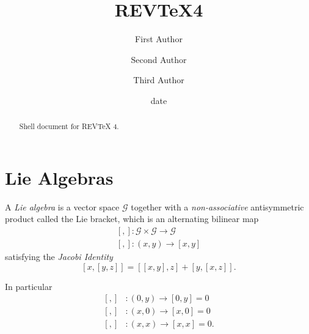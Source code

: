 \documentclass[aps,preprint]{revtex4}%
\begin{document}
\title[Short title for running header]{REV\TeX4}
\author{First Author}
\author{Second Author}
\author{Third Author}

\begin{abstract}
Shell document for REV\TeX{} 4.

\end{abstract}
\date[Date text]{date}




\maketitle
\tableofcontents


\section{Lie Algebras}

A \emph{Lie algebra} is a vector space $\mathcal{G}$ together with a
\emph{non-associative} antisymmetric product called the Lie bracket, which is
an alternating bilinear map
\begin{gather}
\left[  ,\right]  :\mathcal{G}\times\mathcal{G}\rightarrow\mathcal{G}\\
\left[  ,\right]  :\left(  x,y\right)  \rightarrow\left[  x,y\right]
\end{gather}
satisfying the \emph{Jacobi Identity}%
\begin{equation}
\left[  x,\left[  y,z\right]  \right]  =\left[  \left[  x,y\right]  ,z\right]
+\left[  y,\left[  x,z\right]  \right]  .
\end{equation}


In particular
\begin{align}
\left[  ,\right]   &  :\left(  0,y\right)  \rightarrow\left[  0,y\right]  =0\\
\left[  ,\right]   &  :\left(  x,0\right)  \rightarrow\left[  x,0\right]  =0\\
\left[  ,\right]   &  :\left(  x,x\right)  \rightarrow\left[  x,x\right]  =0.
\end{align}
\end{document}
